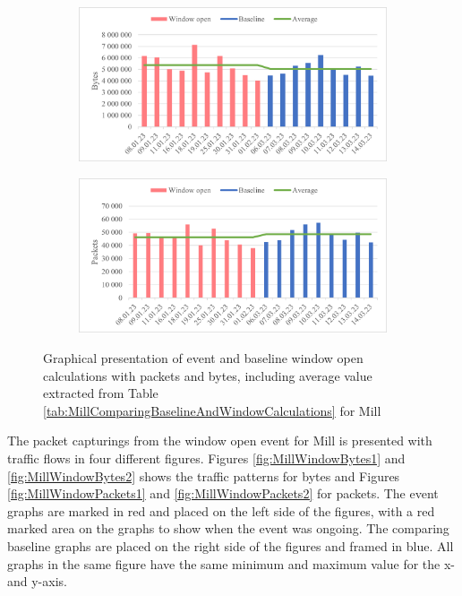 \begin{figure}[H]
    \centering
    \begin{subfigure}{0.8\textwidth}
        \centering
        \includegraphics[width=1\hsize]{figures/Mill_Window_Calculations_Bytes.png} 
    \end{subfigure}
    \begin{subfigure}{0.8\textwidth}
        \centering
        \includegraphics[width=1\hsize]{figures/Mill_Window_Calculations_Packets.png} 
    \end{subfigure}
    \caption{Graphical presentation of event and baseline window open calculations with packets and bytes, including average value extracted from Table \ref{tab:MillComparingBaselineAndWindowCalculations} for Mill}
    \label{fig:MillWindowCalculations}
\end{figure}

The packet capturings from the window open event for Mill is presented with traffic flows in four different figures. Figures \ref{fig:MillWindowBytes1} and \ref{fig:MillWindowBytes2} shows the traffic patterns for bytes and Figures \ref{fig:MillWindowPackets1} and \ref{fig:MillWindowPackets2} for packets. The event graphs are marked in red and placed on the left side of the figures, with a red marked area on the graphs to show when the event was ongoing. The comparing baseline graphs are placed on the right side of the figures and framed in blue. All graphs in the same figure have the same minimum and maximum value for the x- and y-axis. 

